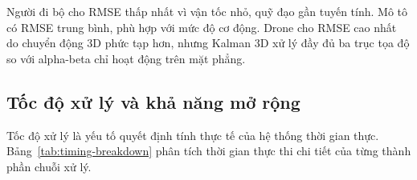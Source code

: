 \begin{table}[H]
\centering
\caption{Phân tích hiệu suất lọc theo loại mục tiêu (seed=42, 120 giây, 10 Hz)}
\label{tab:target-filter-analysis}
\end{table}

Người đi bộ cho RMSE thấp nhất vì vận tốc nhỏ, quỹ đạo gần tuyến tính. Mô tô có RMSE trung bình, phù hợp với mức độ cơ động. Drone cho RMSE cao nhất do chuyển động 3D phức tạp hơn, nhưng Kalman 3D xử lý đầy đủ ba trục tọa độ so với alpha-beta chỉ hoạt động trên mặt phẳng.

\subsection{Tốc độ xử lý và khả năng mở rộng}

\hspace{0.5cm} Tốc độ xử lý là yếu tố quyết định tính thực tế của hệ thống thời gian thực. Bảng~\ref{tab:timing-breakdown} phân tích thời gian thực thi chi tiết của từng thành phần chuỗi xử lý.

\begin{table}[H]
\centering
\caption{Phân tích thời gian thực thi chuỗi xử lý}
\label{tab:timing-breakdown}
\end{table}

